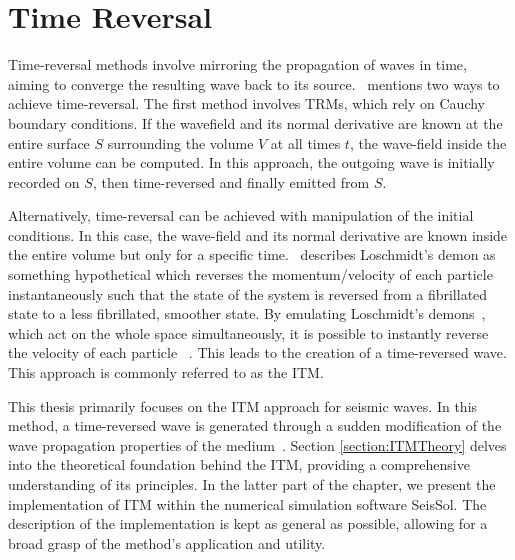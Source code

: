 \chapter{Time Reversal}\label{chapter:TimeReversal}

Time-reversal methods involve mirroring the propagation of waves in time, aiming to converge the resulting wave back to its source.~\parencite{Fink2017} mentions two ways to achieve time-reversal.
The first method involves \ac{TRM}s, which rely on Cauchy boundary conditions. If the wavefield and its normal derivative are known at the entire surface $S$ surrounding the volume
$V$ at all times $t$, the wave-field inside the entire volume can be computed. In this approach, the outgoing wave is initially 
recorded on $S$, then time-reversed and finally emitted from $S$. 

\par Alternatively, time-reversal can be achieved with manipulation of the initial conditions. In this case, the wave-field and its normal derivative
are known inside the entire volume but only for a specific time.~\parencite{Weinert2016} describes Loschmidt's demon as something hypothetical which reverses the momentum/velocity of each particle instantaneously such that the state of the system is reversed 
from a fibrillated state to a less fibrillated, smoother state.
By emulating Loschmidt's demons~\parencite{Weinert2016},  which act on the whole space simultaneously, it is possible to instantly reverse
the velocity of each particle ~\parencite{Fink2017}. This leads to the creation of a time-reversed wave. This approach is commonly referred to as the \acf{ITM}.

\par This thesis primarily focuses on the \ac{ITM} approach for seismic waves. In this method, a time-reversed wave is generated through a sudden modification of the wave propagation
properties of the medium~\parencite{Bacot2016}. Section \ref{section:ITMTheory} delves into the theoretical foundation behind the \ac{ITM}, providing a comprehensive
understanding of its principles. In the latter part of the chapter, we present the implementation of \ac{ITM} within the numerical simulation software SeisSol. The
description of the implementation is kept as general as possible, allowing for a broad grasp of the method's application and utility.

